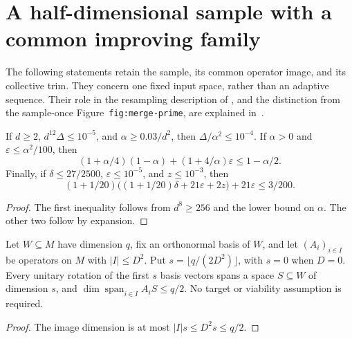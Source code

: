 \section{A half-dimensional sample with a common improving family}

The following statements retain the sample, its common operator image, and
its collective trim. They concern one fixed input space, rather than an
adaptive sequence. Their role in the resampling description of
\cite[lines 749--755]{Arad2016RigorousRG}, and the distinction from the
sample-once Figure~\texttt{fig:merge-prime}, are explained
in~\cite{gap:alvv16_bootstrap_constants}.

\begin{lemma}
    \label{lem:half_sampling_margins}
    \leanok
    If $d\ge2$, $d^{12}\Delta\le10^{-5}$, and
    $\alpha\ge0.03/d^2$, then $\Delta/\alpha^2\le10^{-4}$.
    If $\alpha>0$ and $\varepsilon\le\alpha^2/100$, then
    \[
        (1+\alpha/4)(1-\alpha)+(1+4/\alpha)\varepsilon
        \le1-\alpha/2.
    \]
    Finally, if $\delta\le27/2500$, $\varepsilon\le10^{-5}$, and
    $z\le10^{-3}$, then
    \[
        (1+1/20)\bigl((1+1/20)\delta+21\varepsilon+2z\bigr)
        +21\varepsilon\le3/200.
    \]
\end{lemma}
\begin{proof}\leanok
    The first inequality follows from $d^8\ge256$ and the lower bound on
    $\alpha$. The other two follow by expansion.
\end{proof}

\begin{lemma}
    \label{lem:half_sampling_image_dimension}
    \leanok
    Let $W\subseteq M$ have dimension $q$, fix an orthonormal basis of $W$,
    and let $(A_i)_{i\in I}$ be operators on $M$ with $|I|\le D^2$.
    Put $s=\lfloor q/(2D^2)\rfloor$, with $s=0$ when $D=0$.
    Every unitary rotation of the first $s$ basis vectors spans a space
    $S\subseteq W$ of dimension $s$, and
    $\dim\operatorname{span}_{i\in I}A_iS\le q/2$.
    No target or viability assumption is required.
\end{lemma}
\begin{proof}\leanok
    The image dimension is at most $|I|s\le D^2s\le q/2$.
\end{proof}

